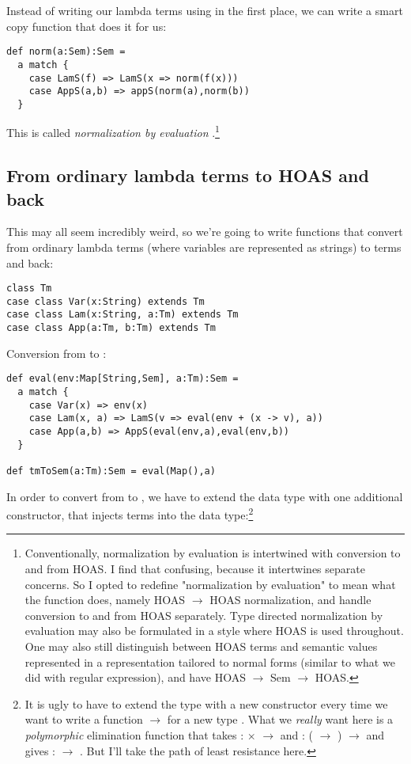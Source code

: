 Instead of writing our lambda terms using  in the first place, we can write a smart copy function that does it for us:

\begin{lstlisting}
def norm(a:Sem):Sem =
  a match {
    case LamS(f) => LamS(x => norm(f(x)))
    case AppS(a,b) => appS(norm(a),norm(b))
  }
\end{lstlisting}

This is called \emph{normalization by evaluation} \cite{berger91}.\footnote{Conventionally, normalization by evaluation is intertwined with conversion to and from HOAS. I find that confusing, because it intertwines separate concerns. So I opted to redefine "normalization by evaluation" to mean what the  function does, namely HOAS $\to$ HOAS normalization, and handle conversion to and from HOAS separately. Type directed normalization by evaluation may also be formulated in a style where HOAS is used throughout. One may also still distinguish between HOAS terms and semantic values represented in a representation tailored to normal forms (similar to what we did with regular expression), and have HOAS $\to$ Sem $\to$ HOAS.}

\subsection{From ordinary lambda terms to HOAS and back}

This may all seem incredibly weird, so we're going to write functions that convert from ordinary lambda terms (where variables are represented as strings) to  terms and back:

\begin{lstlisting}
class Tm
case class Var(x:String) extends Tm
case class Lam(x:String, a:Tm) extends Tm
case class App(a:Tm, b:Tm) extends Tm
\end{lstlisting}

Conversion from  to :

\begin{lstlisting}
def eval(env:Map[String,Sem], a:Tm):Sem =
  a match {
    case Var(x) => env(x)
    case Lam(x, a) => LamS(v => eval(env + (x -> v), a))
    case App(a,b) => AppS(eval(env,a),eval(env,b))
  }

def tmToSem(a:Tm):Sem = eval(Map(),a)
\end{lstlisting}

In order to convert from  to , we have to extend the  data type with one additional constructor, that injects  terms into the  data type:\footnote{
  It is ugly to have to extend the  type with a new constructor  every time we want to write a function  $\to$  for a new type .
  What we \emph{really} want here is a \emph{polymorphic} elimination function  that takes  :  $\times$  $\to$  and  : ( $\to$ ) $\to$  and gives  :  $\to$ .
  But I'll take the path of least resistance here.
}

